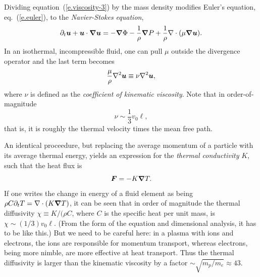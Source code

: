 Dividing equation~(\ref{e.viscosity-3}) by the mass density modifies Euler's equation, eq.~(\ref{e.euler}), to the \emph{Navier-Stokes equation},
\begin{equation}\label{e.navier-stokes}
\partial_{t}\boldsymbol{u} + \boldsymbol{u}\cdot\boldsymbol{\nabla}\boldsymbol{u} = -\boldsymbol{\nabla} \Phi - \frac{1}{\rho}\boldsymbol{\nabla} P + \frac{1}{\rho}\nabla \cdot(\mu \boldsymbol{\nabla}\boldsymbol{u}).
\end{equation}
In an isothermal, incompressible fluid, one can pull $\mu$ outside the divergence operator and the last term becomes
\[ \frac{\mu}{\rho}\nabla^{2}\boldsymbol{u} \equiv \nu \nabla^{2}\boldsymbol{u}, \]
where $\nu$ is defined as the \emph{coefficient of kinematic viscosity}. Note that in order-of-magnitude
\[ \nu \sim \frac{1}{3}v_{0}\ell,\]
that is, it is roughly the thermal velocity times the mean free path.

An identical proceedure, but replacing the average momentum of a particle with its average thermal energy, yields an expression for the \emph{thermal conductivity} $K$, such that the heat flux is
\begin{equation}\label{e.flux-equation}
\boldsymbol{F} = -K\boldsymbol{\nabla} T.
\end{equation}
If one writes the change in energy of a fluid element as being $\rho C \partial_{t}T = \nabla \cdot(K\boldsymbol{\nabla} T)$, it can be seen that in order of magnitude the thermal diffusivity $\chi \equiv K/(\rho C$, where $C$ is the specific heat per unit mass, is $\chi \sim (1/3) v_{0} \ell$.  (From the form of the equation and dimensional analysis, it has to be like this.)  But we need to be careful here: in a plasma with ions and electrons, the ions are responsible for momentum transport, whereas electrons, being more nimble, are more effective at heat transport.  Thus the thermal diffusivity is larger than the kinematic viscosity by a factor $\sim \sqrt{m_{p}/m_{e}}\approx 43$.

